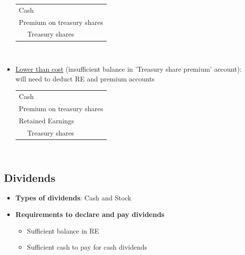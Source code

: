 \documentclass{article}
\begin{document}
\begin{multicols}{2}
\begin{itemize}
	\begin{tabular}{llll}
		\multicolumn{4}{l}{Cash}\\
		\multicolumn{4}{l}{Premium on treasury shares}\\
		& Treasury shares & &
	\end{tabular}\vspace{0.5em}\\
	\item \underline{Lower than cost} (insufficient balance in 'Treasury share premium' account): will need to deduct RE and premium accounts\vspace{0.5em}\\
	\begin{tabular}{llll}
		\multicolumn{4}{l}{Cash}\\
		\multicolumn{4}{l}{Premium on treasury shares}\\
		\multicolumn{4}{l}{Retained Earnings}\\
		& Treasury shares& &
	\end{tabular}\vspace{0.5em}\\
\end{itemize}

\subsection{Dividends}
\begin{itemize}
	\item \textbf{Types of dividends}: Cash and Stock
	\item \textbf{Requirements to declare and pay dividends}
	\begin{itemize}
		\item Sufficient balance in RE
		\item Sufficient cash to pay for cash dividends
	\end{itemize}
\end{itemize}

\end{multicols}
\end{document}
